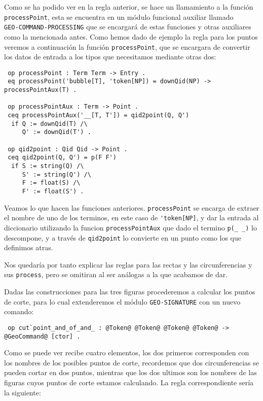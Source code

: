 Como se ha podido ver en la regla anterior, se hace un llamamiento a la función\\ \verb"processPoint", esta se encuentra en un módulo funcional auxiliar llamado\\ \verb"GEO-COMMAND-PROCESSING" que se encargará de estas funciones y otras auxiliares como la mencionada antes. Como hemos dado de ejemplo la regla para los puntos veremos a continuación la función \verb"processPoint", que se encargara de convertir los datos de entrada a los tipos que necesitamos mediante otras dos:

{\codesize
\begin{verbatim}
 op processPoint : Term Term -> Entry .
 eq processPoint('bubble[T], 'token[NP]) = downQid(NP) -> processPointAux(T) .

 op processPointAux : Term -> Point .
 ceq processPointAux('__[T, T']) = qid2point(Q, Q')
  if Q := downQid(T) /\
     Q' := downQid(T') .

 op qid2point : Qid Qid -> Point .
 ceq qid2point(Q, Q') = p(F F')
  if S := string(Q) /\
     S' := string(Q') /\
     F := float(S) /\
     F' := float(S') .
\end{verbatim}
}

Veamos lo que hacen las funciones anteriores. \texttt{processPoint} se encarga de extraer el nombre de uno de los terminos, en este caso de \verb"'token[NP]", y dar la entrada al diccionario utilizando la funcion \texttt{processPointAux} que dado el termino \verb"p(_ _)" lo descompone, y a través de \texttt{qid2point} lo convierte en un punto como los que definimos atras. \par

Nos quedaría por tanto explicar las reglas para las rectas y las circunferencias y sus \verb"process", pero se omitiran al ser análogas a la que acabamos de dar.\par

Dadas las construcciones para las tres figuras procederemos a calcular los puntos de corte, para lo cual extenderemos el módulo \verb"GEO-SIGNATURE" con un nuevo comando:
{\codesize
\begin{verbatim}
 op cut`point_and_of_and_ : @Token@ @Token@ @Token@ @Token@ -> @GeoCommand@ [ctor] .
\end{verbatim}
}

Como se puede ver recibe cuatro elementos, los dos primeros corresponden con los nombres de los posibles puntos de corte, recordemos que dos circunferencias se pueden cortar en dos puntos, mientras que los dos ultimos son los nombres de las figuras cuyos puntos de corte estamos calculando. La regla correspondiente sería la siguiente: \par
 
